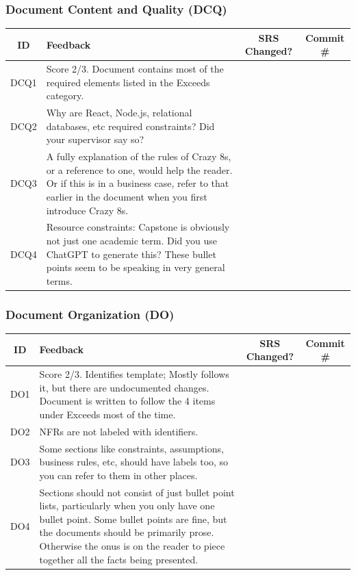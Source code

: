 \documentclass{article}
\begin{document}
\subsubsection{Document Content and Quality (DCQ)}
\begin{table}[h!]
\centering
\begin{tabular}{|c|p{8cm}|c|c|}
\hline
\textbf{ID} & \textbf{Feedback} & \textbf{SRS Changed?} & \textbf{Commit \#} \\ \hline
DCQ1 & Score 2/3. Document contains most of the required elements listed in the Exceeds category. & & \\ \hline
DCQ2 & Why are React, Node.js, relational databases, etc required constraints? Did your supervisor say so? & & \\ \hline
DCQ3 & A fully explanation of the rules of Crazy 8s, or a reference to one, would help the reader. Or if this is in a business case, refer to that earlier in the document when you first introduce Crazy 8s.& & \\ \hline
DCQ4 & Resource constraints: Capstone is obviously not just one academic term. Did you use ChatGPT to generate this? These bullet points seem to be speaking in very general terms. & & \\ \hline
\end{tabular}
\end{table}

\subsubsection{Document Organization (DO)}
\begin{table}[h!]
\centering
\begin{tabular}{|c|p{8cm}|c|c|}
\hline
\textbf{ID} & \textbf{Feedback} & \textbf{SRS Changed?} & \textbf{Commit \#} \\ \hline
DO1 & Score 2/3. Identifies template; Mostly follows it, but there are undocumented changes. Document is written to follow the 4 items under Exceeds most of the time. & & \\ \hline
DO2 & NFRs are not labeled with identifiers. & & \\ \hline
DO3 & Some sections like constraints, assumptions, business rules, etc, should have labels too, so you can refer to them in other places. & & \\ \hline
DO4 & Sections should not consist of just bullet point lists, particularly when you only have one bullet point. Some bullet points are fine, but the documents should be primarily prose. Otherwise the onus is on the reader to piece together all the facts being presented. & & \\ \hline
\end{tabular}
\end{table}
\end{document}
